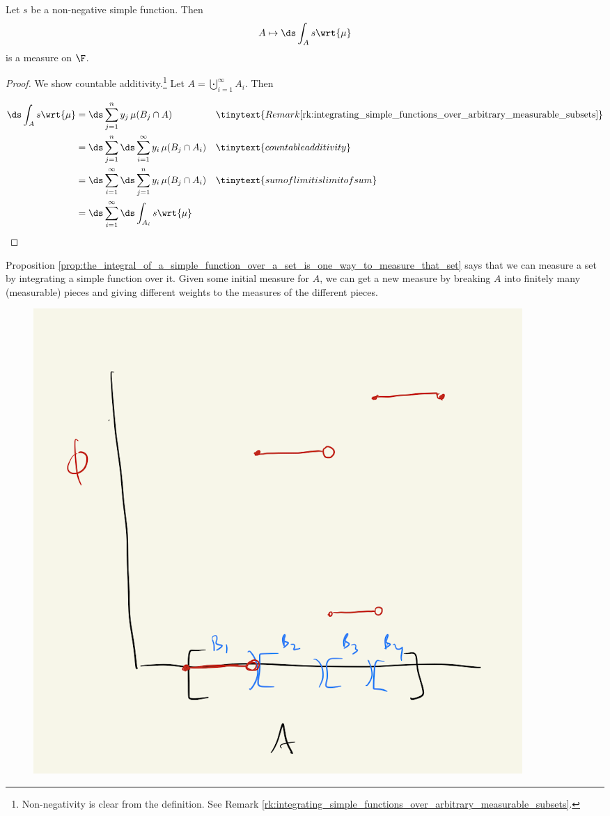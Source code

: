 \documentclass{article} %
\begin{document}
\begin{proposition}
Let $s$ be a non-negative simple function. Then 
\[ A \mapsto \ds\int_A s \wrt{\mu} \]
is a measure on $\F$.
\label{prop:the_integral_of_a_simple_function_over_a_set_is_one_way_to_measure_that_set} 
\end{proposition}

\begin{proof}
We show  countable additivity.\footnote{Non-negativity is clear from the definition.  See Remark \ref{rk:integrating_simple_functions_over_arbitrary_measurable_subsets}.}  Let $A = \bigcupdot_{i=1}^\infty A_i$.  Then

\begin{align*}
\ds\int_A s \wrt{\mu} &= \ds\sum_{j=1}^n y_j \, \mu(B_j \cap A) && \tinytext{Remark \ref{rk:integrating_simple_functions_over_arbitrary_measurable_subsets}} \\
&= \ds\sum_{j=1}^n \ds\sum_{i=1}^\infty y_i \, \mu(B_j \cap A_i) && \tinytext{countable additivity} \\
&= \ds\sum_{i=1}^\infty  \ds\sum_{j=1}^n y_i \, \mu(B_j \cap A_i) && \tinytext{sum of limit is limit of sum} \\
&= \ds\sum_{i=1}^\infty \ds\int_{A_i} s \wrt{\mu}
\end{align*}
\end{proof}

\begin{remark}
Proposition \ref{prop:the_integral_of_a_simple_function_over_a_set_is_one_way_to_measure_that_set} says that we can measure a set by integrating a simple function over it.  Given some initial measure for $A$, we can get a new measure by breaking $A$ into finitely many (measurable) pieces and giving different weights to the measures of the different pieces.

\begin{figure}[H]
\centering
\includegraphics[width=.5\textwidth]{images/integrals_of_simple_functions_induce_new_measures}
\end{figure}
\end{remark}
\end{document}
